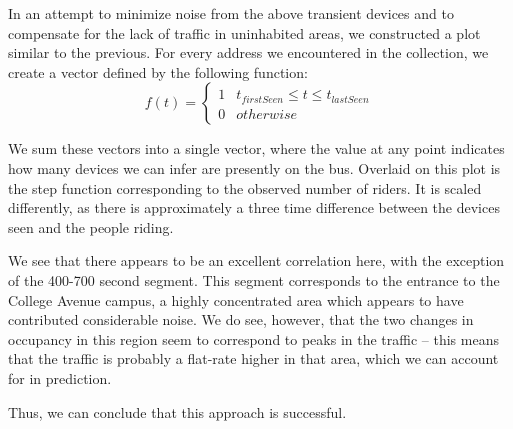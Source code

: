 In an attempt to minimize noise from the above transient devices and to compensate for the lack of traffic in uninhabited areas, we constructed a plot similar to the previous. 
For every address we encountered in the collection, we create a vector defined by the following function:
\begin{equation*}
  f(t) = \begin{cases}
    1 & t_{firstSeen} \le t \le t_{lastSeen}\\
    0 & otherwise
  \end{cases}
\end{equation*}

We sum these vectors into a single vector, where the value at any point indicates how many devices we can infer are presently on the bus.
Overlaid on this plot is the step function corresponding to the observed number of riders.
It is scaled differently, as there is approximately a three time difference between the devices seen and the people riding.

We see that there appears to be an excellent correlation here, with the exception of the 400-700 second segment. %
This segment corresponds to the entrance to the College Avenue campus, a highly concentrated area which appears to have contributed considerable noise.
We do see, however, that the two changes in occupancy in this region seem to correspond to peaks in the traffic -- this means that the traffic is probably a flat-rate higher in that area, which we can account for in prediction.
		
Thus, we can conclude that this approach is successful. %

